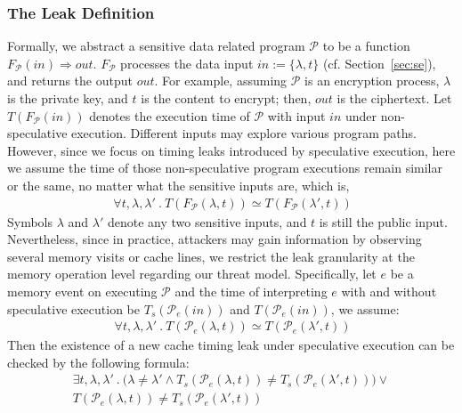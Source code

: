 \documentclass[sigconf]{acmart}
\newcommand{\prog}{\mathcal{P}}
\begin{document}
\subsubsection{The Leak Definition}

Formally, we abstract a sensitive data related program $\prog$ to be a function 
$\mathit{F_{\prog}(in)\Rightarrow out}$. $\mathit{F_{\prog}}$ processes the data 
input $\mathit{in}:=\{\lambda,t\}$ (cf. Section~\ref{sec:se}), and returns the 
output $\mathit{out}$. For example, assuming $\prog$ is an encryption process, 
$\lambda$ is the private key, and $t$ is the content to encrypt; then, $out$ is 
the ciphertext. Let $T(F_{\prog}(in))$ denotes the execution time of $\prog$ with 
input $\mathit{in}$ under non-speculative execution. Different inputs may explore 
various program paths. However, since we focus on timing leaks introduced by 
speculative execution, here we assume the time of those non-speculative program 
executions remain similar or the same, no matter what the sensitive inputs are, 
which is, 
%
\begin{multline} 
  \label{lb:no_leak_event}
  ~~~~~\mathit{\forall t,\lambda,\lambda'~.~T(F_{\prog}(\lambda,t)) \simeq 
  T(F_{\prog}(\lambda',t))}~~~~
\end{multline} 
%
Symbols $\lambda$ and $\lambda'$ denote any two sensitive inputs, and $t$ is still 
the public input. Nevertheless, since in practice, attackers may gain information 
by observing several memory visits or cache lines, we restrict the leak granularity 
at the memory operation level regarding our threat model. Specifically, let $\mathit{e}$ 
be a memory event on executing $\prog$ and the time of interpreting $\mathit{e}$ with 
and without speculative execution be 
$\mathit{T_{s}(\prog_e(in))}$ and $\mathit{T(\prog_e(in))}$, we assume:
%
\begin{multline} 
  \label{lb:no_leak_event}
  ~~~~~\mathit{\forall t,\lambda,\lambda'~.~T(\prog_e(\lambda,t)) \simeq 
  T(\prog_e(\lambda',t))}~~~~
\end{multline} 
%
Then the existence of a new cache timing leak under speculative execution can be 
checked by the following formula: 
%
\begin{multline}
\label{lb:specu_leak}
\mathit{\exists t,\lambda,\lambda'~.~
	\big(
			\lambda \neq \lambda' \wedge T_{s}({\prog_e}(\lambda,t)) 
			\neq T_{s}({\prog_e}(\lambda',t))}
	\big)
	\vee 
	\\  
	T({\prog_e}(\lambda,t)) \neq T_{s}({\prog_e}(\lambda',t)) ~~~
\end{multline}
\end{document}
